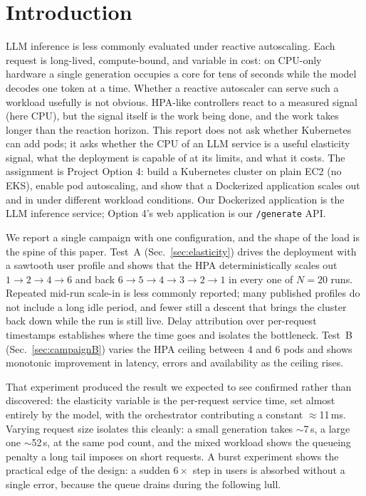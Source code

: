 \documentclass[conference]{IEEEtran}
\newcommand{\code}[1]{\texttt{#1}}
\begin{document}
\section{Introduction}

LLM inference is less commonly evaluated under reactive autoscaling. Each
request is long-lived, compute-bound, and variable in cost: on CPU-only
hardware a single generation occupies a core for tens of seconds while the
model decodes one token at a time. Whether a reactive autoscaler can serve
such a workload usefully is not obvious. HPA-like controllers react to a
measured signal (here CPU), but the signal itself is the work being done,
and the work takes longer than the reaction horizon. This report does not
ask whether Kubernetes can add pods; it asks whether the CPU of an LLM
service is a useful elasticity signal, what the deployment is capable of at
its limits, and what it costs. The assignment is Project Option 4: build a
Kubernetes cluster on plain EC2 (no EKS), enable pod autoscaling, and show
that a Dockerized application scales out and in under different workload
conditions. Our Dockerized application is the LLM inference service; Option
4's web application is our \code{/generate} API.

We report a single campaign with one configuration, and the shape of the
load is the spine of this paper. Test~A (Sec.~\ref{sec:elasticity}) drives
the deployment with a sawtooth user profile and shows that the HPA
deterministically scales out $1{\to}2{\to}4{\to}6$ and back
$6{\to}5{\to}4{\to}3{\to}2{\to}1$ in every one of $N{=}20$ runs. Repeated
mid-run scale-in is less commonly reported; many published profiles do not
include a long idle period, and fewer still a descent that brings the
cluster back down while the run is still live. Delay attribution over
per-request timestamps establishes where the time goes and isolates the
bottleneck. Test~B (Sec.~\ref{sec:campaignB}) varies the HPA
ceiling between 4 and 6 pods and shows monotonic improvement in latency,
errors and availability as the ceiling rises.

That experiment produced the result we expected to see confirmed rather than
discovered: the elasticity variable is the per-request service time, set
almost entirely by the model, with the orchestrator contributing a constant
$\approx$11\,ms. Varying request size isolates this cleanly: a small
generation takes $\sim$7\,s, a large one $\sim$52\,s, at the same pod count, and the
mixed workload shows the queueing penalty a long tail imposes on short
requests. A burst experiment shows the practical edge of the design: a
sudden $6\times$ step in users is absorbed without a single error, because
the queue drains during the following lull.
\end{document}
